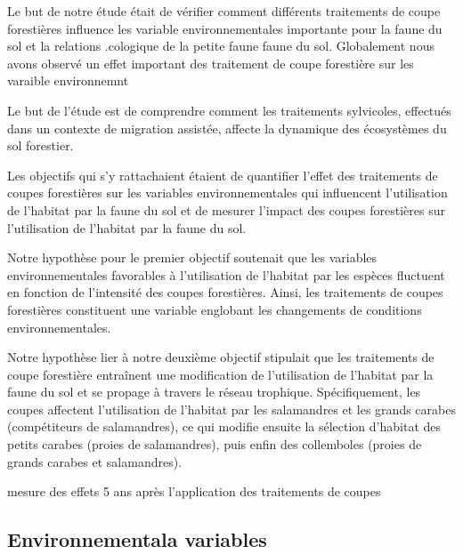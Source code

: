 Le but de notre étude était de vérifier comment différents traitements de coupe forestières influence les variable environnementales importante pour la faune du sol et la relations .cologique de la petite faune faune du sol.
 Globalement nous avons observé un effet important des traitement de coupe forestière sur les varaible environnemnt



Le but de l'étude est de comprendre comment les traitements sylvicoles, effectués dans un contexte de migration assistée, 
affecte la dynamique des écosystèmes du sol forestier. 

Les objectifs qui s’y rattachaient étaient de quantifier l'effet des traitements de coupes forestières sur les variables environnementales qui influencent l'utilisation de l'habitat par la faune du sol 
et de mesurer l'impact des coupes forestières sur l'utilisation de l'habitat par la faune du sol.

Notre hypothèse pour le premier objectif soutenait que les variables environnementales favorables à l'utilisation de l'habitat par les espèces fluctuent 
en fonction de l'intensité des coupes forestières. Ainsi, les traitements de coupes forestières constituent une variable englobant 
les changements de conditions environnementales.

Notre hypothèse lier à notre deuxième objectif stipulait que les traitements de coupe forestière entraînent une modification de l'utilisation de l'habitat 
par la faune du sol et se propage à travers le réseau trophique. Spécifiquement, les coupes affectent l'utilisation de l'habitat par les salamandres et 
les grands carabes (compétiteurs de salamandres), ce qui modifie ensuite la sélection d'habitat des petits carabes (proies de salamandres), 
puis enfin des collemboles (proies de grands carabes et salamandres).

mesure des effets 5 ans après l'application des traitements de coupes



\subsection*{Environnementala variables}
\label{disc:env_var}

